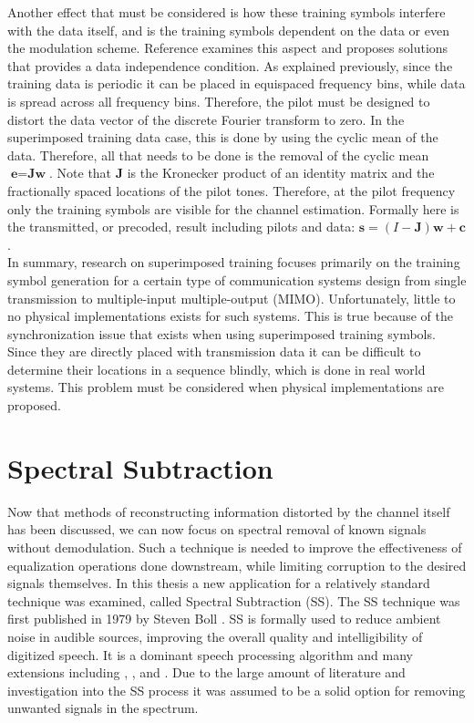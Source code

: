Another effect that must be considered is how these training symbols interfere with the data itself, and is the training symbols dependent on the data or even the modulation scheme.  Reference \cite{Ghogho} examines this aspect and proposes solutions that provides a data independence condition.  As explained previously, since the training data is periodic it can be placed in equispaced frequency bins, while data is spread across all frequency bins.   Therefore, the pilot must be designed to distort the data vector of the discrete Fourier transform to zero.  In the superimposed training data case, this is done by using the cyclic mean of the data.  Therefore, all that needs to be done is the removal of the cyclic mean \(\textbf{e}=\textbf{Jw}\).  Note that \(\textbf{J}\) is the Kronecker product of an identity matrix and the fractionally spaced locations of the pilot tones.  Therefore, at the pilot frequency only the training symbols are visible for the channel estimation.  Formally here is the transmitted, or precoded, result including pilots and data: \( \textbf{s}= (I-\textbf{J})\textbf{w}+\textbf{c}  \).\\


In summary, research on superimposed training focuses primarily on the training symbol generation for a certain type of communication systems design from single transmission to multiple-input multiple-output (MIMO).  Unfortunately, little to no physical implementations exists for such systems.  This is true because of the synchronization issue that exists when using superimposed training symbols.  Since they are directly placed with transmission data it can be difficult to determine their locations in a sequence blindly, which is done in real world systems.  This problem must be considered when physical implementations are proposed.\\

\section{Spectral Subtraction}

Now that methods of reconstructing information distorted by the channel itself has been discussed, we can now focus on spectral removal of known signals without demodulation.  Such a technique is needed to improve the effectiveness of equalization operations done downstream, while limiting corruption to the desired signals themselves.  In this thesis a new application for a relatively standard technique was examined, called Spectral Subtraction (SS).  The SS technique was first published in 1979 by Steven Boll \cite{boll}. SS is formally used to reduce ambient noise in audible sources, improving the overall quality and intelligibility of digitized speech.  It is a dominant speech processing algorithm and many extensions including \cite{SSEXAMPLE}, \cite{SSEXAMPLE2}, and \cite{SSEXAMPLE3}.  Due to the large amount of literature and investigation into the SS process it was assumed to be a solid option for removing unwanted signals in the spectrum.\\

